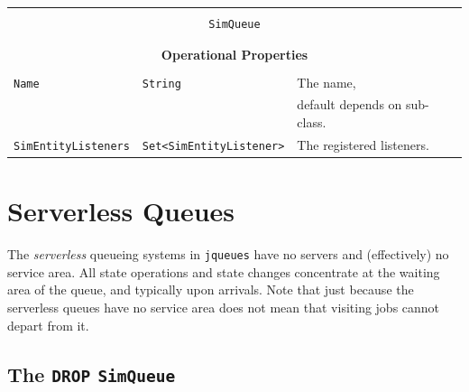 \documentclass[12pt]{book}
\begin{document}
\begin{tabular}{|l|l|l|}
\hline
\multicolumn{3}{|c|}{} \\
\multicolumn{3}{|c|}{\lstinline[basicstyle=\large]{SimQueue}} \\
\multicolumn{3}{|c|}{} \\
\hline
\multicolumn{3}{|c|}{} \\
\multicolumn{3}{|c|}{\bf Operational Properties} \\
\multicolumn{3}{|c|}{} \\
\hline
\lstinline|Name|               & \lstinline|String| & The name, \\
                               &                    & default depends on sub-class. \\
\hline
\lstinline|SimEntityListeners| & \lstinline|Set<SimEntityListener>| & The registered listeners. \\
\hline
\end{tabular}

\section{Serverless Queues}

The {\em serverless\/} queueing systems in \lstinline|jqueues| 
  have no servers and (effectively) no service area.
All state operations and state changes concentrate
  at the waiting area of the queue,
  and typically upon arrivals.
Note that just because the serverless queues have no service area
  does not mean that visiting jobs cannot depart from it.

\subsection{The \lstinline{DROP} \lstinline{SimQueue}}
\end{document}
